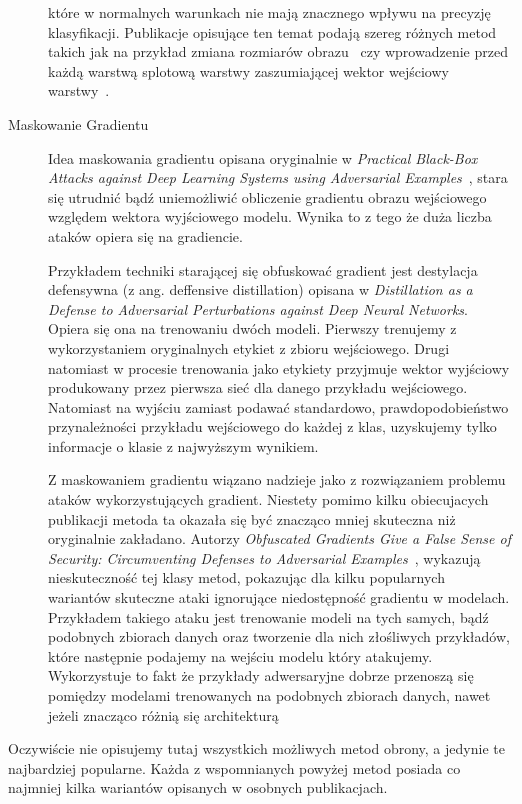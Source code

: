 \documentclass[
    left=2.5cm,         %
    right=2.5cm,        %
    top=2.5cm,          %
    bottom=3cm,         %
    bindingoffset=6mm,  %
    nohyphenation=false %
]{eiti/eiti-thesis}
\begin{document}
\begin{description}
        które w normalnych warunkach nie mają znacznego wpływu na precyzję klasyfikacji.
        Publikacje opisujące ten temat podają szereg różnych metod takich jak na przykład zmiana rozmiarów obrazu~\cite{DBLP:journals/corr/abs-1711-01991} czy
        wprowadzenie przed każdą warstwą splotową warstwy zaszumiającej wektor wejściowy warstwy~\cite{DBLP:journals/corr/abs-1712-00673}.
    \item[Maskowanie Gradientu]
        Idea maskowania gradientu opisana oryginalnie w \textit{Practical Black-Box Attacks against Deep Learning Systems using Adversarial Examples}~\cite{DBLP:journals/corr/PapernotMGJCS16},
        stara się utrudnić bądź uniemożliwić obliczenie gradientu obrazu wejściowego względem wektora wyjściowego modelu.
        Wynika to z tego że duża liczba ataków opiera się na gradiencie.

        Przykładem techniki starającej się obfuskować gradient jest destylacja defensywna (z ang. deffensive distillation) opisana w
        \textit{Distillation as a Defense to Adversarial Perturbations against Deep Neural Networks}\cite{DBLP:journals/corr/PapernotMWJS15}.
        Opiera się ona na trenowaniu dwóch modeli.
        Pierwszy trenujemy z wykorzystaniem oryginalnych etykiet z zbioru wejściowego.
        Drugi natomiast w procesie trenowania jako etykiety przyjmuje wektor wyjściowy produkowany przez pierwsza sieć dla danego przykładu wejściowego.
        Natomiast na wyjściu zamiast podawać standardowo, prawdopodobieństwo przynależności przykładu wejściowego do każdej z klas, uzyskujemy tylko informacje o
        klasie z najwyższym wynikiem.

        Z maskowaniem gradientu wiązano nadzieje jako z rozwiązaniem problemu ataków wykorzystujących gradient. Niestety pomimo kilku obiecujacych publikacji
        metoda ta okazała się być znacząco mniej skuteczna niż oryginalnie zakładano.
        Autorzy \textit{Obfuscated Gradients Give a False Sense of Security: Circumventing Defenses to Adversarial Examples}~\cite{DBLP:journals/corr/abs-1802-00420},
        wykazują nieskuteczność tej klasy metod, pokazując dla kilku popularnych wariantów skuteczne ataki ignorujące niedostępność gradientu w modelach.
        Przykładem takiego ataku jest trenowanie modeli na tych samych, bądź podobnych zbiorach danych oraz tworzenie dla nich złośliwych przykładów, które
        następnie podajemy na wejściu modelu który atakujemy. Wykorzystuje to fakt że przykłady adwersaryjne dobrze przenoszą się pomiędzy modelami trenowanych na
        podobnych zbiorach danych, nawet jeżeli znacząco różnią się architekturą


\end{description}
Oczywiście nie opisujemy tutaj wszystkich możliwych metod obrony, a jedynie te najbardziej popularne. Każda z wspomnianych powyżej metod posiada co najmniej kilka
wariantów opisanych w osobnych publikacjach.
\newpage
\end{document}
